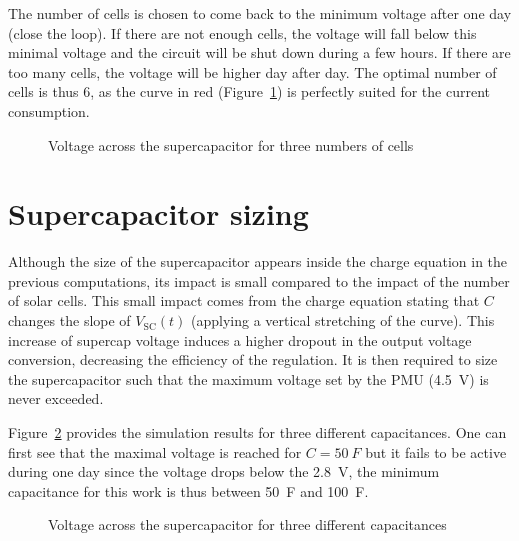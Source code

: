 \documentclass{EPL-master-thesis-covers-EN}
\newcommand{\te}[1]{\textrm{#1}}
\begin{document}
The number of cells is chosen to come back to the minimum voltage after one day (close the loop). If there are not enough cells, the voltage will fall below this minimal voltage and the circuit will be shut down during a few hours. If there are too many cells, the voltage will be higher day after day. The optimal number of cells is thus 6, as the curve in red (Figure~\ref{fig:Supercap_voltage}) is perfectly suited for the current consumption.

\begin{figure}[H]
    \centering
    
    \caption{Voltage across the supercapacitor for three numbers of cells}
    \label{fig:Supercap_voltage}
\end{figure}

\section{Supercapacitor sizing}
\label{supercap_sizing}

Although the size of the supercapacitor appears inside the charge equation in the previous computations, its impact is small compared to the impact of the number of solar cells. This small impact comes from the charge equation stating that $C$ changes the slope of $V_\te{SC}(t)$ (applying a vertical stretching of the curve). This increase of supercap voltage induces a higher dropout in the output voltage conversion, decreasing the efficiency of the regulation. It is then required to size the supercapacitor such that the maximum voltage set by the PMU (\SI{4.5}{V}) is never exceeded.

Figure~\ref{fig:Supercap_voltage_C} provides the simulation results for three different capacitances. One can first see that the maximal voltage is reached for $C = \SI{50}{F}$ but it fails to be active during one day since the voltage drops below the \SI{2.8}{V}, the minimum capacitance for this work is thus between \SI{50}{F} and \SI{100}{F}.

\begin{figure}[H]
    \centering
    
    \caption{Voltage across the supercapacitor for three different capacitances}
    \label{fig:Supercap_voltage_C}
\end{figure}

\end{document}
